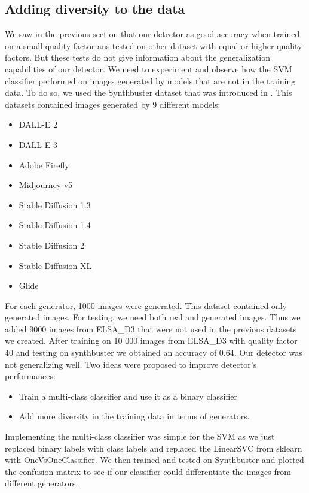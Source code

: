 \documentclass[12pt,a4paper]{article}
\begin{document}
\subsection{Adding diversity to the data}
We saw in the previous section that our detector as good accuracy when trained on a small quality factor ans tested on other dataset with equal or higher quality factors. But these tests do not give information about the generalization capabilities of our detector. We need to experiment and observe how the SVM classifier performed on images generated by models that are not in the training data. To do so, we used the Synthbuster dataset that was introduced in \autocite{bammeySynthbusterDetectionDiffusion2024}. This datasets contained images generated by 9 different models:
\begin{itemize}
    \item DALL-E 2
    \item DALL-E 3
    \item Adobe Firefly
    \item Midjourney v5
    \item Stable Diffusion 1.3
    \item Stable Diffusion 1.4
    \item Stable Diffusion 2
    \item Stable Diffusion XL
    \item Glide
\end{itemize}

For each generator, 1000 images were generated. This dataset contained only generated images. For testing, we need both real and generated images. Thus we added 9000 images from ELSA\_D3 that were not used in the previous datasets we created.
After training on 10 000 images from ELSA\_D3 with quality factor 40 and testing on synthbuster we obtained an accuracy of 0.64. Our detector was not generalizing well. Two ideas were proposed to improve detector's performances:
\begin{itemize}
    \item Train a multi-class classifier and use it as a binary classifier
    \item Add more diversity in the training data in terms of generators.
\end{itemize}

Implementing the multi-class classifier was simple for the SVM as we just replaced binary labels with class labels and replaced the LinearSVC from sklearn with OneVsOneClassifier. We then trained and tested on Synthbuster and plotted the confusion matrix to see if our classifier could differentiate the images from different generators.
\end{document}

